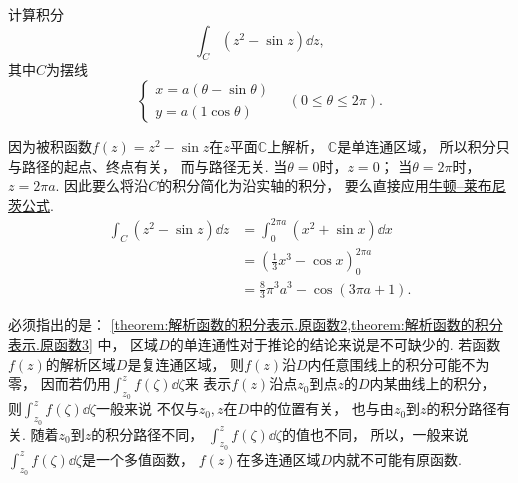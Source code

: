 \begin{example}
计算积分\begin{equation*}
	\int_C (z^2 - \sin z) \dd{z},
\end{equation*}
其中\(C\)为摆线\begin{equation*}
	\left\{ \begin{array}{l}
	x = a(\theta-\sin\theta) \\
	y = a(1\cos\theta)
	\end{array} \right.
	\quad(0\leq\theta\leq2\pi).
\end{equation*}
\begin{solution}
因为被积函数\(f(z) = z^2 - \sin z\)在\(z\)平面\(\mathbb{C}\)上解析，
\(\mathbb{C}\)是单连通区域，
所以积分只与路径的起点、终点有关，
而与路径无关.
当\(\theta=0\)时，\(z=0\)；
当\(\theta=2\pi\)时，\(z=2\pi a\).
因此要么将沿\(C\)的积分简化为沿实轴的积分，
要么直接应用\hyperref[equation:解析函数的积分表示.牛顿莱布尼茨公式]{牛顿--莱布尼茨公式}.
\begin{align*}
	\int_C (z^2 - \sin z) \dd{z}
	&= \int_0^{2\pi a} (x^2 + \sin x) \dd{x} \\
	&= \left(\frac{1}{3} x^3 - \cos x\right)_0^{2\pi a} \\
	&= \frac{8}{3} \pi^3 a^3 - \cos(3\pi a+1).
\end{align*}
\end{solution}
\end{example}

必须指出的是：
\cref{theorem:解析函数的积分表示.原函数2,theorem:解析函数的积分表示.原函数3} 中，
区域\(D\)的单连通性对于推论的结论来说是不可缺少的.
若函数\(f(z)\)的解析区域\(D\)是复连通区域，
则\(f(z)\)沿\(D\)内任意围线上的积分可能不为零，
因而若仍用\(\int_{z_0}^z f(\zeta) \dd{\zeta}\)来
表示\(f(z)\)沿点\(z_0\)到点\(z\)的\(D\)内某曲线上的积分，
则\(\int_{z_0}^z f(\zeta) \dd{\zeta}\)一般来说
不仅与\(z_0,z\)在\(D\)中的位置有关，
也与由\(z_0\)到\(z\)的积分路径有关.
随着\(z_0\)到\(z\)的积分路径不同，
\(\int_{z_0}^z f(\zeta) \dd{\zeta}\)的值也不同，
所以，一般来说\(\int_{z_0}^z f(\zeta) \dd{\zeta}\)是一个多值函数，
\(f(z)\)在多连通区域\(D\)内就不可能有原函数.

